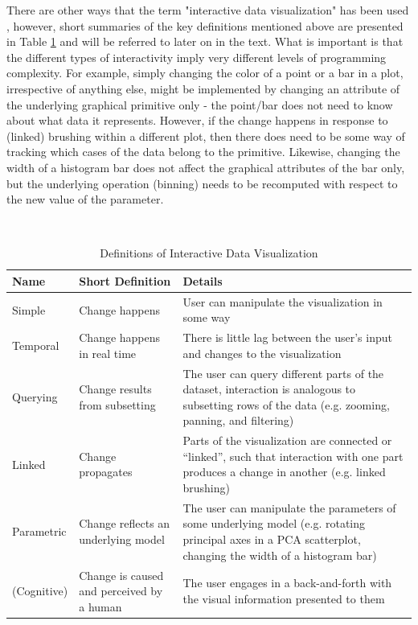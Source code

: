\documentclass[12pt,a4paper]{article}
\begin{document}
There are other ways that the term "interactive data visualization" has been used \citep[for more detailed taxonomies, see][]{yi2007}, however, short summaries of the key definitions mentioned above are presented in Table \ref{tab:definitions} and will be referred to later on in the text. What is important is that the different types of interactivity imply very different levels of programming complexity. For example, simply changing the color of a point or a bar in a plot, irrespective of anything else, might be implemented by changing an attribute of the underlying graphical primitive only - the point/bar does not need to know about what data it represents. However, if the change happens in response to (linked) brushing within a different plot, then there does need to be some way of tracking which cases of the data belong to the primitive. Likewise, changing the width of a histogram bar does not affect the graphical attributes of the bar only, but the underlying operation (binning) needs to be recomputed with respect to the new value of the parameter.  

\begin{table}[ht]
\caption{
Definitions of Interactive Data Visualization
}
\centering
\ ~~~~ \\
\label{tab:definitions}
\begin{tabular}{|p{2cm}|p{6cm}|p{8cm}|}
\hline
Name & Short Definition & Details \\
\hline

Simple & Change happens & User can manipulate the visualization in some way \\

Temporal & Change happens in real time & There is little lag between the user's input and changes to the visualization  \\

Querying & Change results from subsetting & The user can query different parts of the dataset, interaction is analogous to subsetting rows of the data (e.g. zooming, panning, and filtering) \\ 

Linked & Change propagates & Parts of the visualization are connected or “linked”, such that interaction with one part produces a change in another (e.g. linked brushing) \\

Parametric & Change reflects an underlying model & The user can manipulate the parameters of some underlying model (e.g. rotating principal axes in a PCA scatterplot, changing the width of a histogram bar) \\

(Cognitive) & Change is caused and perceived by a human & The user engages in a back-and-forth with the visual information presented to them \\

\hline
\end{tabular}
\end{table}
\end{document}
